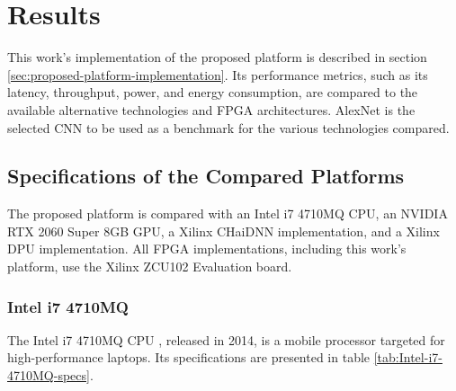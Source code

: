 \chapter{Results}
This work's implementation of the proposed platform is described in section \ref{sec:proposed-platform-implementation}. Its performance metrics, such as its latency, throughput, power, and energy consumption, are compared to the available alternative technologies and FPGA architectures. AlexNet is the selected CNN to be used as a benchmark for the various technologies compared.

\section{Specifications of the Compared Platforms}
The proposed platform is compared with an Intel i7 4710MQ CPU, an NVIDIA RTX 2060 Super 8GB GPU, a Xilinx CHaiDNN implementation, and a Xilinx DPU implementation. All FPGA implementations, including this work's platform, use the Xilinx ZCU102 Evaluation board.



\subsection{Intel i7 4710MQ}
The Intel i7 4710MQ CPU \cite{Intel-i7-4710MQ-Processor}, released in 2014, is a mobile processor targeted for high-performance laptops. Its specifications are presented in table \ref{tab:Intel-i7-4710MQ-specs}.

